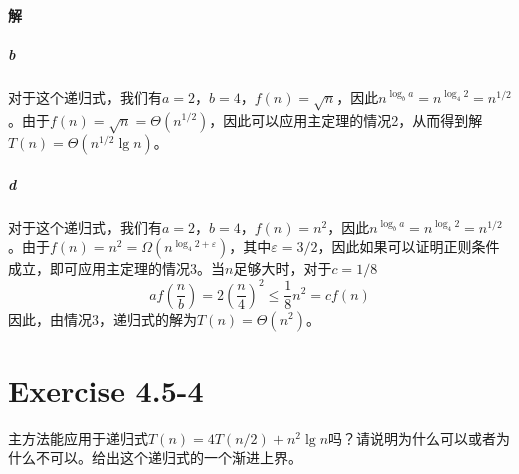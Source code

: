 \documentclass{article}
\begin{document}
\paragraph{解}
\subparagraph{b}
对于这个递归式，我们有$a=2$，$b=4$，$f(n)=\sqrt{n}$，因此$n^{\log_b{a}}=n^{\log_4{2}}=n^{1/2}$。由于$f(n)=\sqrt{n}=\Theta\left(n^{1/2}\right)$，因此可以应用主定理的情况2，从而得到解$T(n)=\Theta\left(n^{1/2} \lg{n}\right)$。
\subparagraph{d}
对于这个递归式，我们有$a=2$，$b=4$，$f(n)=n^2$，因此$n^{\log_b{a}}=n^{\log_4{2}}=n^{1/2}$。由于$f(n)=n^2=\Omega\left(n^{\log_4{2}+\varepsilon}\right)$，其中$\varepsilon = 3/2$，因此如果可以证明正则条件成立，即可应用主定理的情况3。当$n$足够大时，对于$c=1/8$
\begin{equation*}
    a f\left(\frac{n}{b}\right) = 2\left(\frac{n}{4}\right)^2 \leq \frac{1}{8}n^2 = c f(n)
\end{equation*}
因此，由情况3，递归式的解为$T(n) = \Theta\left(n^2\right)$。
\\

\FloatBarrier
\section{Exercise 4.5-4}
主方法能应用于递归式$T(n)=4T(n/2)+n^2\lg{n}$吗？请说明为什么可以或者为什么不可以。给出这个递归式的一个渐进上界。
\\
\end{document}

